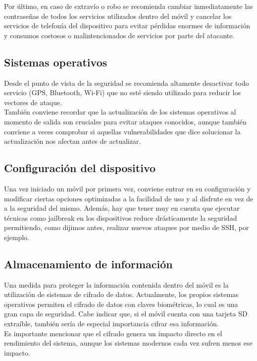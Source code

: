 \documentclass[11pt]{article}
\begin{document}
{Por último, en caso de extravío o robo se recomienda cambiar inmediatamente las contraseñas de todos los servicios utilizados dentro del móvil y cancelar los servicios de telefonía del dispositivo para evitar pérdidas enormes de información y consumos costosos o malintencionados de servicios por parte del atacante.}

\subsection{Sistemas operativos}

{Desde el punto de vista de la seguridad se recomienda altamente desactivar todo servicio (GPS, Bluetooth, Wi-Fi) que no esté siendo utilizado para reducir los vectores de ataque.} \\

{También conviene recordar que la actualización de los sistemas operativos al momento de salida son cruciales para evitar ataques conocidos, aunque también conviene a veces comprobar si aquellas vulnerabilidades que dice solucionar la actualización nos afectan antes de actualizar.}

\subsection{Configuración del dispositivo}

{Una vez iniciado un móvil por primera vez, conviene entrar en su configuración y modificar ciertas opciones optimizadas a la facilidad de uso y al disfrute en vez de a la seguridad del mismo. Además, hay que tener muy en cuenta que ejecutar técnicas como jailbreak en los dispositivos reduce drásticamente la seguridad permitiendo, como dijimos antes, realizar nuevos ataques por medio de SSH, por ejemplo.}

\subsection{Almacenamiento de información}

{Una medida para proteger la información contenida dentro del móvil es la utilización de sistemas de cifrado de datos. Actualmente, los propios sistemas operativos permiten el cifrado de datos con claves biométricas, lo cual es una gran capa de seguridad. Cabe indicar que, si el móvil cuenta con una tarjeta SD extraíble, también sería de especial importancia cifrar esa información.} \\

{Es importante mencionar que el cifrado genera un impacto directo en el rendimiento del sistema, aunque los sistemas modernos cada vez sufren menos ese impacto.} \\
\end{document}
